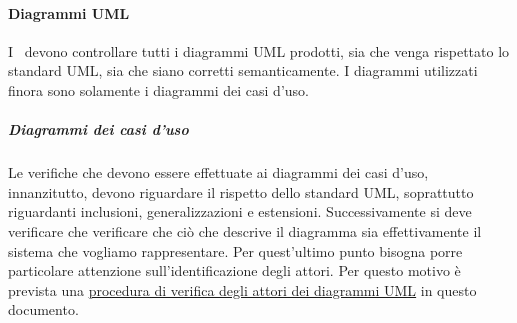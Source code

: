 \documentclass[../NormeProgetto.tex]{subfiles}
\begin{document}
	\paragraph{Diagrammi UML}
		I \verificatori\ devono controllare tutti i diagrammi UML prodotti, sia che venga rispettato lo standard UML, sia che siano corretti semanticamente. I diagrammi utilizzati finora sono solamente i diagrammi dei casi d'uso.
			\subparagraph{Diagrammi dei casi d'uso}
			Le verifiche che devono essere effettuate ai diagrammi dei casi d'uso, innanzitutto, devono riguardare il rispetto dello standard UML, soprattutto riguardanti inclusioni, generalizzazioni e estensioni. Successivamente si deve verificare che verificare che ciò che descrive il diagramma sia effettivamente il sistema che vogliamo rappresentare. Per quest'ultimo punto bisogna porre particolare attenzione sull'identificazione degli attori. Per questo motivo è prevista una \hyperref[par:Procedura di verifica degli attori dei diagrammi UML]{procedura di verifica degli attori dei diagrammi UML} in questo documento.\\ 
\end{document}
